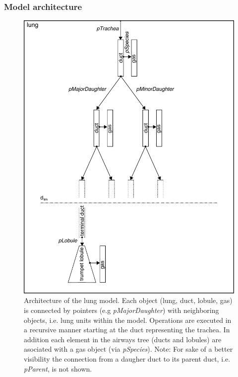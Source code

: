 \subsubsection{Model architecture}
\begin{figure}[tb!]
\centering
\includegraphics[width=\textwidth]{figures/model_architecture}
\caption{Architecture of the lung model. Each object (lung, duct, lobule, gas) is connected by pointers (e.g \textit{pMajorDaughter}) with neighboring objects, i.e. lung units within the model. Operations are executed in a recursive manner starting at the duct representing the trachea. In addition each element in the airways tree (ducts and lobules) are asociated with a gas object (via \textit{pSpecies}). Note: For sake of a better visibility the connection from a daugher duct to its parent duct, i.e. \textit{pParent}, is not shown.}
\label{fig:model_architecture}
\end{figure}


